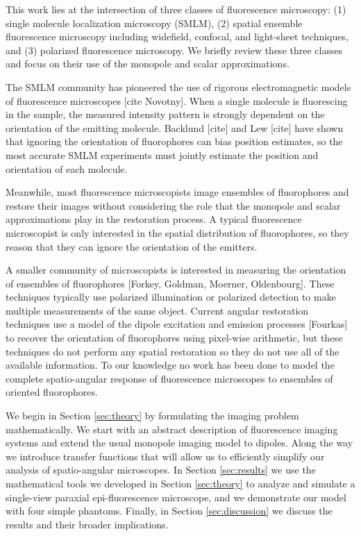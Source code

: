 \documentclass[]{osa-article}
\begin{document}
This work lies at the intersection of three classes of fluorescence microscopy:
(1) single molecule localization microscopy (SMLM), (2) spatial ensemble
fluorescence microscopy including widefield, confocal, and light-sheet
techniques, and (3) polarized fluorescence microscopy. We briefly review these
three classes and focus on their use of the monopole and scalar approximations.

The SMLM community has pioneered the use of rigorous electromagnetic models of
fluorescence microscopes \cite{backer2014, lieb2004} [cite Novotny]. When a
single molecule is fluorescing in the sample, the measured intensity pattern is
strongly dependent on the orientation of the emitting molecule. Backlund [cite]
and Lew [cite] \cite{backlund2014} have shown that ignoring the orientation of
fluorophores can bias position estimates, so the most accurate SMLM experiments
must jointly estimate the position and orientation of each molecule.

Meanwhile, most fluorescence microscopists image ensembles of fluorophores and
restore their images without considering the role that the monopole and scalar
approximations play in the restoration process. A typical fluorescence
microscopist is only interested in the spatial distribution of fluorophores, so
they reason that they can ignore the orientation of the emitters.

A smaller community of microscopists is interested in measuring the orientation
of ensembles of fluorophores \cite{mehta2016} [Forkey, Goldman, Moerner,
Oldenbourg]. These techniques typically use polarized illumination or polarized
detection to make multiple measurements of the same object. Current angular
restoration techniques use a model of the dipole excitation and emission
processes [Fourkas] to recover the orientation of fluorophores using pixel-wise
arithmetic, but these techniques do not perform any spatial restoration so they
do not use all of the available information. To our knowledge no work has been
done to model the complete spatio-angular response of fluorescence microscopes
to ensembles of oriented fluorophores.

We begin in Section \ref{sec:theory} by formulating the imaging problem
mathematically. We start with an abstract description of fluorescence imaging
systems and extend the usual monopole imaging model to dipoles. Along the way we
introduce transfer functions that will allow us to efficiently simplify our
analysis of spatio-angular microscopes. In Section \ref{sec:results} we use the
mathematical tools we developed in Section \ref{sec:theory} to analyze and
simulate a single-view paraxial epi-fluorescence microscope, and we demonstrate
our model with four simple phantoms. Finally, in Section \ref{sec:discussion} we
discuss the results and their broader implications.
\end{document}
